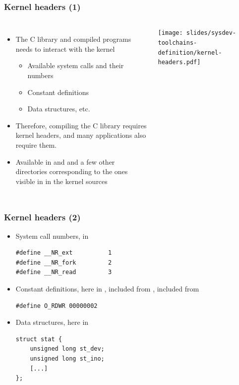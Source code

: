 \begin{frame}
  \frametitle{Kernel headers (1)}
  \begin{columns}
    \begin{itemize}
    \item The C library and compiled programs needs to interact with the kernel
      \begin{itemize}
      \item Available system calls and their numbers
      \item Constant definitions
      \item Data structures, etc.
      \end{itemize}
    \item Therefore, compiling the C library requires kernel headers, and many
      applications also require them.
    \item Available in  and  and a few
      other directories corresponding to the ones visible in
       in the kernel sources
    \end{itemize}
    \texttt{[image: slides/sysdev-toolchains-definition/kernel-headers.pdf]}
  \end{columns}
\end{frame}

\begin{frame}[fragile]
  \frametitle{Kernel headers (2)}
  \begin{itemize}
  \item System call numbers, in 
\begin{verbatim}
#define __NR_ext          1
#define __NR_fork         2
#define __NR_read         3
\end{verbatim}
  \item Constant definitions, here in ,
    included from , included from
\begin{verbatim}
#define O_RDWR 00000002
\end{verbatim}
\item Data structures, here in 
\begin{verbatim}
struct stat {
    unsigned long st_dev;
    unsigned long st_ino;
    [...]
};
\end{verbatim}
\end{itemize}
\end{frame}

